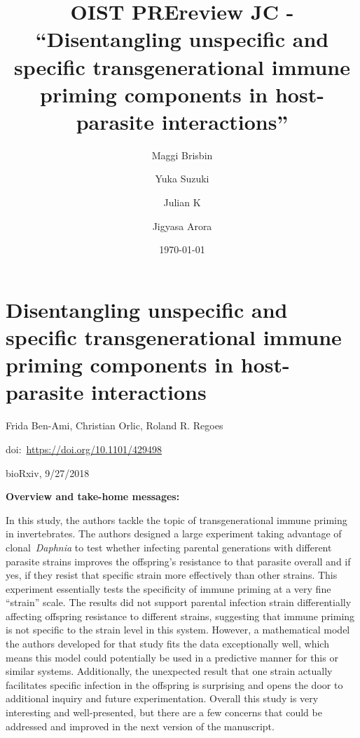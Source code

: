 \documentclass[10pt]{article}
\begin{document}
\title{OIST PREreview JC - ``Disentangling unspecific and specific
transgenerational immune priming components in host-parasite
interactions''}



\author[1]{Maggi Brisbin}%
\author[1]{Yuka Suzuki}%
\author[1]{Julian K}%
\author[1]{Jigyasa Arora}%
%


\vspace{-1em}



  \date{\today}


\begingroup
\let\center\flushleft
\let\endcenter\endflushleft
\maketitle
\endgroup









\section*{Disentangling unspecific and specific transgenerational immune
priming components in host-parasite
interactions}

{\label{272979}}

Frida Ben-Ami, Christian Orlic, Roland R. Regoes~

doi:~\url{https://doi.org/10.1101/429498}

bioRxiv, 9/27/2018

\par\null

\textbf{Overview and take-home messages:}

In this study, the authors tackle the topic of transgenerational immune
priming in invertebrates. The authors designed a large experiment taking
advantage of clonal~\emph{Daphnia} to test whether infecting parental
generations with different parasite strains improves the offspring's
resistance to that parasite overall and if yes, if they resist that
specific strain more effectively than other strains. This experiment
essentially tests the specificity of immune priming at a very fine
``strain'' scale. The results did not support parental infection strain
differentially affecting offspring resistance to different strains,
suggesting that immune priming is not specific to the strain level in
this system. However, a mathematical model the authors developed for
that study fits the data exceptionally well, which means this model
could potentially be used in a predictive manner for this or similar
systems. Additionally, the unexpected result that one strain actually
facilitates specific infection in the offspring is surprising and opens
the door to additional inquiry and future experimentation. Overall this
study is very interesting and well-presented, but there are a few
concerns that could be addressed and improved in the next version of the
manuscript.
\end{document}
